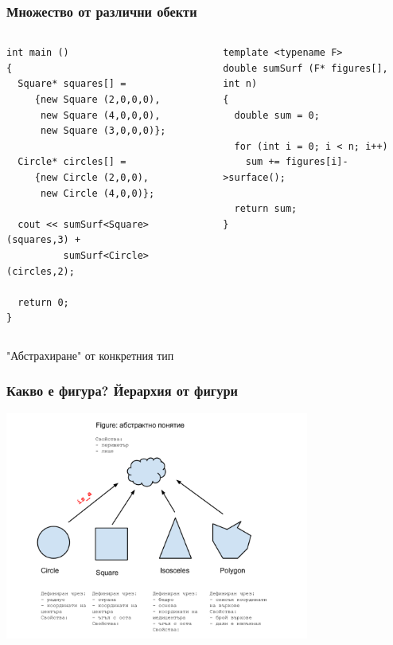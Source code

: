 \documentclass{beamer}
\begin{document}
\begin{frame}[fragile]
\frametitle{Множество от различни обекти}


\begin{columns}[t]
  \begin{column}{0.5\textwidth}
\begin{flushleft}
\begin{lstlisting}
int main ()
{
  Square* squares[] =
     {new Square (2,0,0,0),
      new Square (4,0,0,0),
      new Square (3,0,0,0)};

  Circle* circles[] =
     {new Circle (2,0,0),
      new Circle (4,0,0)};

  cout << sumSurf<Square> (squares,3) +
          sumSurf<Circle> (circles,2);

  return 0;
}
\end{lstlisting}
\end{flushleft}
  \end{column}
  \begin{column}{0.5\textwidth}


\begin{flushleft}
\begin{lstlisting}
template <typename F>
double sumSurf (F* figures[], int n)
{
  double sum = 0;

  for (int i = 0; i < n; i++)
    sum += figures[i]->surface();

  return sum;
}
\end{lstlisting}
\end{flushleft}

  \end{column}
\end{columns}


\end{frame}


\begin{frame}
\centerline{"Абстрахиране" от конкретния тип}
\end{frame}



\begin{frame}[fragile]
\frametitle{Какво е фигура? Йерархия от фигури}

\begin{center}
\includegraphics[width=10.0cm]{images/figures_figure}
\end{center}

\end{frame}
\end{document}
